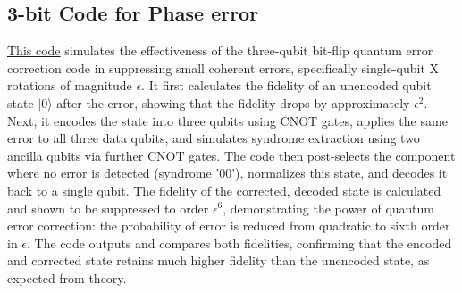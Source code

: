 \documentclass[conference]{IEEEtran}
\begin{document}
\subsection{3-bit Code for Phase error}
\href{https://github.com/jaymehta132/QuantumErrorCorrection-EE7001/blob/main/Codes/scripts/3bitPhaseEC.py}{This code} simulates the effectiveness of the three-qubit bit-flip quantum error correction code in suppressing small coherent errors, specifically single-qubit X rotations of magnitude $\epsilon$. It first calculates the fidelity of an unencoded qubit state $|0\rangle$ after the error, showing that the fidelity drops by approximately $\epsilon^2$. Next, it encodes the state into three qubits using CNOT gates, applies the same error to all three data qubits, and simulates syndrome extraction using two ancilla qubits via further CNOT gates. The code then post-selects the component where no error is detected (syndrome '00'), normalizes this state, and decodes it back to a single qubit. The fidelity of the corrected, decoded state is calculated and shown to be suppressed to order $\epsilon^6$, demonstrating the power of quantum error correction: the probability of error is reduced from quadratic to sixth order in $\epsilon$. The code outputs and compares both fidelities, confirming that the encoded and corrected state retains much higher fidelity than the unencoded state, as expected from theory.
\end{document}
